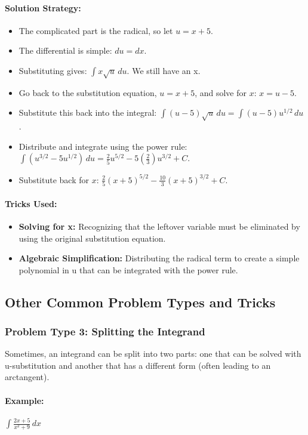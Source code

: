 \documentclass{article}
\begin{document}
\paragraph{Solution Strategy:}
\begin{itemize}
    \item The complicated part is the radical, so let $u = x+5$.
    \item The differential is simple: $du = dx$.
    \item Substituting gives: $\int x\sqrt{u} \,du$. We still have an x.
    \item Go back to the substitution equation, $u = x+5$, and solve for $x$: $x = u-5$.
    \item Substitute this back into the integral: $\int (u-5)\sqrt{u} \,du = \int (u-5)u^{1/2} \,du$.
    \item Distribute and integrate using the power rule: $\int (u^{3/2} - 5u^{1/2}) \,du = \frac{2}{5}u^{5/2} - 5(\frac{2}{3})u^{3/2} + C$.
    \item Substitute back for $x$: $\frac{2}{5}(x+5)^{5/2} - \frac{10}{3}(x+5)^{3/2} + C$.
\end{itemize}
\paragraph{Tricks Used:}
\begin{itemize}
    \item \textbf{Solving for x:} Recognizing that the leftover variable must be eliminated by using the original substitution equation.
    \item \textbf{Algebraic Simplification:} Distributing the radical term to create a simple polynomial in u that can be integrated with the power rule.
\end{itemize}

\subsection{Other Common Problem Types and Tricks}
\subsubsection{Problem Type 3: Splitting the Integrand}
Sometimes, an integrand can be split into two parts: one that can be solved with u-substitution and another that has a different form (often leading to an arctangent).
\paragraph{Example:} $ \int \frac{2x+5}{x^2+9} \,dx $
\end{document}
